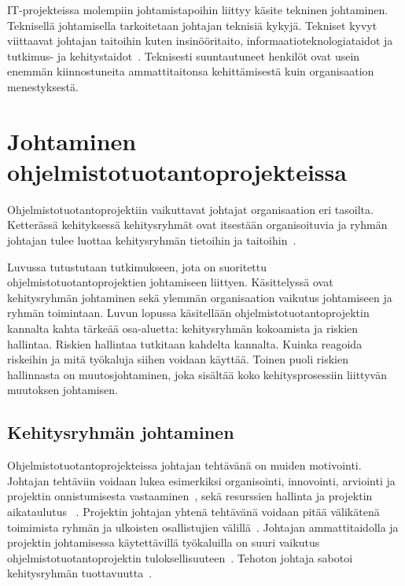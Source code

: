 \documentclass[finnish]{tktltiki2}
\theoremstyle{definition}
\theoremstyle{remark}
\begin{document}
IT-projekteissa molempiin johtamistapoihin liittyy käsite tekninen johtaminen. Teknisellä johtamisella tarkoitetaan johtajan teknisiä kykyjä. Tekniset kyvyt viittaavat johtajan taitoihin kuten insinööritaito, informaatioteknologiataidot ja tutkimus- ja kehitystaidot~\cite{thite2000leadership}. Teknisesti suuntautuneet henkilöt ovat usein enemmän kiinnostuneita ammattitaitonsa kehittämisestä kuin organisaation menestyksestä. 

   



  


\section{Johtaminen ohjelmistotuotantoprojekteissa}

Ohjelmistotuotantoprojektiin vaikuttavat johtajat organisaation eri tasoilta. Ketterässä kehityksessä kehitysryhmät ovat  itsestään organisoituvia ja ryhmän johtajan tulee luottaa kehitysryhmän tietoihin ja taitoihin~\cite{fowler2001agile}.

Luvussa tutustutaan tutkimukseen, jota on suoritettu ohjelmistotuotantoprojektien johtamiseen liittyen. Käsittelyssä ovat kehitysryhmän johtaminen sekä ylemmän organisaation vaikutus johtamiseen ja ryhmän toimintaan. Luvun lopussa käsitellään ohjelmistotuotantoprojektin kannalta kahta tärkeää osa-aluetta: kehitysryhmän kokoamista ja riskien hallintaa. Riskien hallintaa tutkitaan kahdelta kannalta. Kuinka reagoida riskeihin ja mitä työkaluja siihen voidaan käyttää. Toinen puoli riskien hallinnasta on muutosjohtaminen, joka sisältää koko kehitysprosessiin liittyvän muutoksen johtamisen.

\subsection{Kehitysryhmän johtaminen}

Ohjelmistotuotantoprojekteissa johtajan tehtävänä on muiden motivointi. Johtajan tehtäviin voidaan lukea esimerkiksi organisointi, innovointi, arviointi ja projektin onnistumisesta vastaaminen~\cite{4017705}, sekä resurssien hallinta ja projektin aikataulutus ~\cite{Dhomne:2012:ITL:2382887.2382899}. Projektin johtajan yhtenä tehtävänä voidaan pitää välikätenä toimimista ryhmän ja ulkoisten osallistujien välillä~\cite{McLeod:2011:FAS:1978802.1978803}. Johtajan ammattitaidolla ja projektin johtamisessa käytettävillä työkaluilla on suuri vaikutus ohjelmistotuotantoprojektin tuloksellisuuteen~\cite{McLeod:2011:FAS:1978802.1978803}. Tehoton johtaja sabotoi kehitysryhmän tuottavuutta~\cite{bradley1997effect}.
\end{document}
